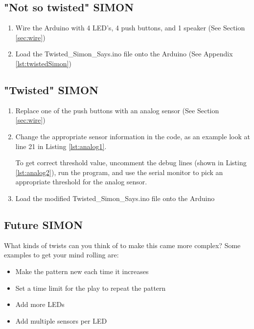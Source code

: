 \documentclass[12pt,letterpaper,oneside]{article}
\begin{document}
		\subsection{"Not so twisted" SIMON}
			\begin{enumerate}
				\item Wire the Arduino with 4 LED's, 4 push buttons, and 1 speaker (See Section \ref{sec:wire})
				\item Load the Twisted\_Simon\_Says.ino file onto the Arduino (See Appendix \ref{lst:twistedSimon})
			\end{enumerate}
								
		\subsection{"Twisted" SIMON}
			\begin{enumerate}
				\item Replace one of the push buttons with an analog sensor (See Section \ref{sec:wire})
				\item Change the appropriate sensor information in the code, as an example look at line 21 in Listing \ref{lst:analog1}.
					\begin{center}
						\begin{minipage}{.9\textwidth}
							
						\end{minipage}
					\end{center}
					To get correct threshold value, uncomment the debug lines (shown in Listing \ref{lst:analog2}), run the program, and use the serial monitor to pick an appropriate threshold for the analog sensor. 
					\begin{center}
						\begin{minipage}{.9\textwidth}
							
						\end{minipage}
					\end{center}
				\item Load the modified Twisted\_Simon\_Says.ino file onto the Arduino
			\end{enumerate}
						
		\subsection{Future SIMON}
			What kinds of twists can you think of to make this came more complex? Some examples to get your mind rolling are:
			\begin{itemize} \parskip0pt
				\item Make the pattern new each time it increases
				\item Set a time limit for the play to repeat the pattern
				\item Add more LEDs
				\item Add multiple sensors per LED
			\end{itemize}
\newpage
\appendix
\end{document}
